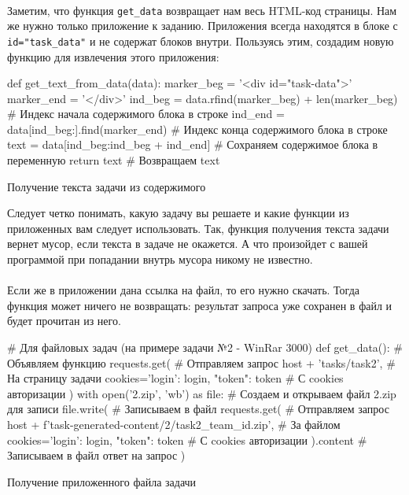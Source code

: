 \documentclass[12pt]{article}
\begin{document}
    \paragraph{}
    Заметим, что функция \verb|get_data| возвращает нам весь HTML-код страницы.
    Нам же нужно только приложение к заданию.
    Приложения всегда находятся в блоке с \verb|id="task_data"| и не содержат блоков внутри.
    Пользуясь этим, создадим новую функцию для извлечения этого приложения:

    \begin{listing}[H]
        \begin{pythoncode}
def get_text_from_data(data):
    marker_beg = '<div id="task-data">'
    marker_end = '</div>'
    ind_beg = data.rfind(marker_beg) + len(marker_beg)  # Индекс начала содержимого блока в строке
    ind_end = data[ind_beg:].find(marker_end)           # Индекс конца содержимого блока в строке
    text = data[ind_beg:ind_beg + ind_end]              # Сохраняем содержимое блока в переменную
    return text                                         # Возвращаем text
        \end{pythoncode}
        \caption{Получение текста задачи из содержимого}
        \label{lst:get_text_from_data}
    \end{listing}

    Следует четко понимать, какую задачу вы решаете и какие функции из приложенных вам следует использовать.
    Так, функция получения текста задачи вернет мусор, если текста в задаче не окажется.
    А что произойдет с вашей программой при попадании внутрь мусора никому не известно.
    \paragraph{}
    Если же в приложении дана ссылка на файл, то его нужно скачать.
    Тогда функция может ничего не возвращать: результат запроса уже сохранен в файл и будет прочитан из него.

    \begin{listing}[H]
        \begin{pythoncode}
# Для файловых задач (на примере задачи №2 - WinRar 3000)
def get_data():                                          # Объявляем функцию
    requests.get(                                        # Отправляем запрос
        host + 'tasks/task2',                            # На страницу задачи
        cookies={'login': login, "token": token}         # С cookies авторизации
    )
    with open('2.zip', 'wb') as file:                    # Создаем и открываем файл 2.zip для записи
        file.write(                                      # Записываем в файл
            requests.get(                                # Отправляем запрос
                host + f'task-generated-content/2/task2_{team_id}.zip', # За файлом
                cookies={'login': login, "token": token} # С cookies авторизации
            ).content                                    # Записываем в файл ответ на запрос
        )
        \end{pythoncode}
        \caption{Получение приложенного файла задачи}
        \label{lst:get_data_file}
    \end{listing}
\end{document}
